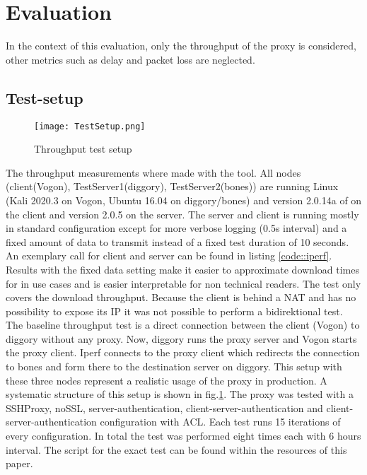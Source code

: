 \documentclass[12pt, a4paper]{scrartcl}
\begin{document}
\section{Evaluation}
In the context of this evaluation, only the throughput of the proxy is considered, other metrics such as delay and packet loss are neglected.
\subsection{Test-setup}
\begin{figure}[b]
    \centering
    \texttt{[image: TestSetup.png]}
    \caption{Throughput test setup}\label{fig::test}
\end{figure}
The throughput measurements where made with the  tool. All nodes (client(Vogon), TestServer1(diggory), TestServer2(bones)) are running Linux (Kali 2020.3 on Vogon, Ubuntu 16.04 on diggory/bones) and version 2.0.14a of  on the client and version 2.0.5 on the server. The  server and client is running mostly in standard configuration except for more verbose logging (0.5s interval) and a fixed amount of data to transmit instead of a fixed test duration of 10 seconds. An exemplary call for client and server can be found in listing \ref{code::iperf}. Results with the fixed data setting make it easier to approximate download times for in use cases and is easier interpretable for non technical readers.\newline
The test only covers the download throughput. Because the client is behind a NAT and has no possibility to expose its IP it was not possible to perform a bidirektional test.\newline
The baseline throughput test is a direct connection between the  client (Vogon) to diggory without any proxy. Now, diggory runs the proxy server and Vogon starts the proxy client. Iperf connects to the proxy client which redirects the connection to bones and form there to the destination  server on diggory. This setup with these three nodes represent a realistic usage of the proxy in production. A systematic structure of this setup is shown in fig.\@\ref{fig::test}.\newline
The proxy was tested with a SSHProxy, noSSL, server-authentication, client-server-authentication and client-server-authentication configuration with \ac{ACL}. Each test runs 15 iterations of every configuration. In total the test was performed eight times each with 6 hours interval. The script for the exact test can be found within the resources of this paper.
\end{document}

